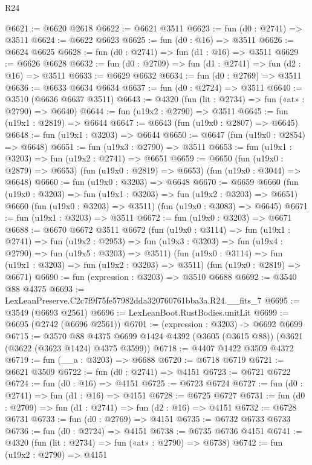 \begin{lexlean}{R24}
\begin{coremodule}
@6621 := @6620 @2618
@6622 := @6621 @3511
@6623 := fun (d0 : @2741) => @3511
@6624 := @6622 @6623
@6625 := fun (d0 : @16) => @3511
@6626 := @6624 @6625
@6628 := fun (d0 : @2741) => fun (d1 : @16) => @3511
@6629 := @6626 @6628
@6632 := fun (d0 : @2709) => fun (d1 : @2741) => fun (d2 : @16) => @3511
@6633 := @6629 @6632
@6634 := fun (d0 : @2769) => @3511
@6636 := @6633 @6634 @6634
@6637 := fun (d0 : @2724) => @3511
@6640 := @3510 (@6636 @6637 @3511)
@6643 := @4320 (fun (lit : @2734) => fun («at» : @2790) => @6640)
@6644 := fun (u19x2 : @2790) => @3511
@6645 := fun (u19x1 : @2819) => @6644
@6647 := @6643 (fun (u19x0 : @2807) => @6645)
@6648 := fun (u19x1 : @3203) => @6644
@6650 := @6647 (fun (u19x0 : @2854) => @6648)
@6651 := fun (u19x3 : @2790) => @3511
@6653 := fun (u19x1 : @3203) => fun (u19x2 : @2741) => @6651
@6659 := @6650
    (fun (u19x0 : @2879) => @6653)
    (fun (u19x0 : @2819) => @6653)
    (fun (u19x0 : @3044) => @6648)
@6660 := fun (u19x0 : @3203) => @6648
@6670 := @6659
    @6660
    (fun (u19x0 : @3203) => fun (u19x1 : @3203) => fun (u19x2 : @3203) => @6651)
    @6660
    (fun (u19x0 : @3203) => @3511)
    (fun (u19x0 : @3083) => @6645)
@6671 := fun (u19x1 : @3203) => @3511
@6672 := fun (u19x0 : @3203) => @6671
@6688 := @6670
    @6672
    @3511
    @6672
    (fun (u19x0 : @3114) =>
    fun (u19x1 : @2741) =>
    fun (u19x2 : @2953) =>
    fun (u19x3 : @3203) => fun (u19x4 : @2790) => fun (u19x5 : @3203) => @3511)
    (fun (u19x0 : @3114) => fun (u19x1 : @3203) => fun (u19x2 : @3203) => @3511)
    (fun (u19x0 : @2819) => @6671)
@6690 := fun (expression : @3203) => @3510 @6688
@6692 := @3540 @88 @4375
@6693 := LexLeanPreserve.C2c7f9f75fe57982dda320760761bba3a.R24.__fits_7
@6695 := @3549 (@6693 @2561)
@6696 := LexLeanBoot.RustBodies.unitLit
@6699 := @6695 (@2742 (@6696 @2561))
@6701 := (expression : @3203) -> @6692 @6699
@6715 := @3570
    @88
    @4375
    @6699
    @1424
    @4392
    (@3605 (@3615 @88))
    (@3621 (@3622 (@3623 @1424) @4375 @3599))
@6718 := @4407 @1422 @3509 @4372
@6719 := fun (__a : @3203) => @6688
@6720 := @6718 @6719
@6721 := @6621 @3509
@6722 := fun (d0 : @2741) => @4151
@6723 := @6721 @6722
@6724 := fun (d0 : @16) => @4151
@6725 := @6723 @6724
@6727 := fun (d0 : @2741) => fun (d1 : @16) => @4151
@6728 := @6725 @6727
@6731 := fun (d0 : @2709) => fun (d1 : @2741) => fun (d2 : @16) => @4151
@6732 := @6728 @6731
@6733 := fun (d0 : @2769) => @4151
@6735 := @6732 @6733 @6733
@6736 := fun (d0 : @2724) => @4151
@6738 := @6735 @6736 @4151
@6741 := @4320 (fun (lit : @2734) => fun («at» : @2790) => @6738)
@6742 := fun (u19x2 : @2790) => @4151

\end{coremodule}
\end{lexlean}

